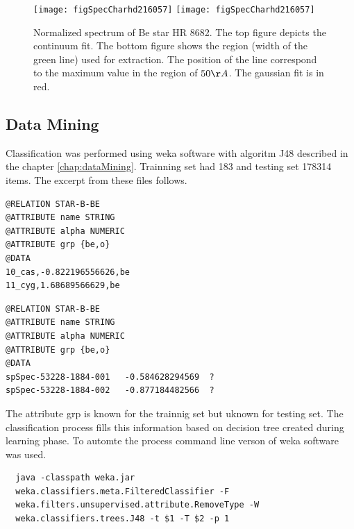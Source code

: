    \begin{figure}[!htbp]
      \begin{center}
        \leavevmode
        \ifpdf
        \texttt{[image: figSpecCharhd216057]}
        \else
        \texttt{[image: figSpecCharhd216057]}
        \fi
        \caption{Normalized spectrum of Be star HR 8682. The top
          figure depicts the continuum fit. The bottom figure shows
          the region (width of the green line) used for
          extraction. The position of the line correspond to the
          maximum value in the region of $50\AA$. The gaussian fit is
          in red.}
        \label{FigSpecChar}
      \end{center}
    \end{figure}


\clearpage




\subsection{Data Mining}
Classification was performed using weka software with algoritm J48
described in the chapter \ref{chap:dataMining}. Trainning set had 183
and testing set 178314 items. The excerpt from these files follows.

\begin{lstlisting}
@RELATION STAR-B-BE
@ATTRIBUTE name STRING
@ATTRIBUTE alpha NUMERIC
@ATTRIBUTE grp {be,o}
@DATA
10_cas,-0.822196556626,be
11_cyg,1.68689566629,be
\end{lstlisting}

\begin{lstlisting}
@RELATION STAR-B-BE
@ATTRIBUTE name STRING
@ATTRIBUTE alpha NUMERIC
@ATTRIBUTE grp {be,o}
@DATA	 
spSpec-53228-1884-001	-0.584628294569	 ?
spSpec-53228-1884-002	-0.877184482566	 ?
\end{lstlisting}

The attribute \textrm{grp} is known for the trainnig set but uknown
for testing set. The classification process fills this information
based on decision tree created during learning phase. To automte the
process command line verson of weka software was used.

\begin{lstlisting}
  java -classpath weka.jar
  weka.classifiers.meta.FilteredClassifier -F
  weka.filters.unsupervised.attribute.RemoveType -W
  weka.classifiers.trees.J48 -t $1 -T $2 -p 1
\end{lstlisting}



